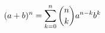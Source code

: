 \documentclass[preview]{standalone}
\begin{document}
\begin{align*}
\special{dvisvgm:raw <g id='unique000'>}(a+b)^n = \sum_{k=0}^{n} \binom{n}{k} a^{n-k} b^k\special{dvisvgm:raw </g>}
\end{align*}
\end{document}
